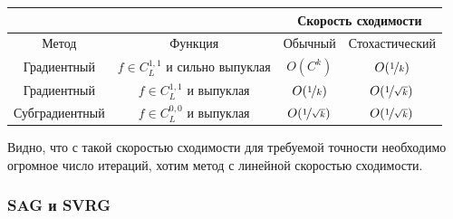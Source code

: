 \begin{center}
{\renewcommand{\arraystretch}{1.4}
\begin{tabular}{|c|c|c|c|}
    \hline
    & & \multicolumn{2}{|c|}{Скорость сходимости} \\
    \hline
    Метод          & Функция                               & Обычный                     & Стохастический              \\
    \hline
    Градиентный    & $f \in C^{1,1}_{L}$ и сильно выпуклая & $O(C^k)$                    & $O(\nicefrac{1}{k})$        \\
    \hline
    Градиентный    & $f \in C^{1,1}_{L}$ и выпуклая        & $O(\nicefrac{1}{k})$        & $O(\nicefrac{1}{\sqrt{k}})$ \\
    \hline
    Субградиентный & $f \in C^{0,0}_{L}$ и выпуклая        & $O(\nicefrac{1}{\sqrt{k}})$ & $O(\nicefrac{1}{\sqrt{k}})$ \\
    \hline
\end{tabular}
}
\end{center}
Видно, что с такой скоростью сходимости для требуемой точности необходимо огромное число итераций, хотим метод с линейной скоростью сходимости.

\subsubsection{SAG и SVRG}

